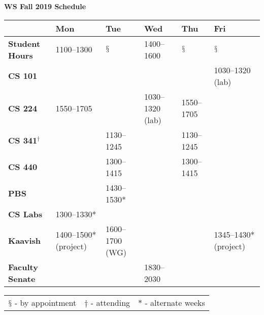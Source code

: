 \documentclass[landscape]{article}
\begin{document}
\thispagestyle{empty}

\pagebreak
\hspace{0pt}
\vfill
\centerline{ \Huge \textbf{WS Fall 2019 Schedule}  }
\bigskip

\Large


\begin{tabularx}{\textwidth}{|>{\bfseries}X||*{5}{X|}}
  \hline
  & \textbf{Mon} & \textbf{Tue} & \textbf{Wed} & \textbf{Thu} & \textbf{Fri}\\\hline\hline
  Student Hours & 1100--1300 & $\mathsection$ & 1400--1600 & $\mathsection$ & $\mathsection$ \\\hline\hline
  CS 101 & & & & & 1030--1320 (lab) \\\hline
  CS 224 & 1550--1705 & & 1030--1320 (lab) & 1550--1705 &  \\\hline
  CS 341$^\dagger$ & & 1130--1245 & & 1130--1245  &  \\\hline
  CS 440 & & 1300--1415 & & 1300--1415  &  \\\hline\hline
  PBS & & 1430--1530* & & &   \\\hline
  CS Labs & 1300--1330*& & & &  \\\hline
  Kaavish & 1400--1500* (project) & 1600--1700 (WG) & & & 1345--1430* (project)\\\hline
  Faculty Senate & & & 1830--2030 & &  \\\hline
\end{tabularx}
\normalsize
\bigskip
\begin{tabularx}{\textwidth}{*{3}{X}}
  $\mathsection$ - by appointment &
  $\dagger$ - attending &
  $*$ - alternate weeks 
\end{tabularx}
\vfill
\hspace{0pt}
\pagebreak
\end{document}
